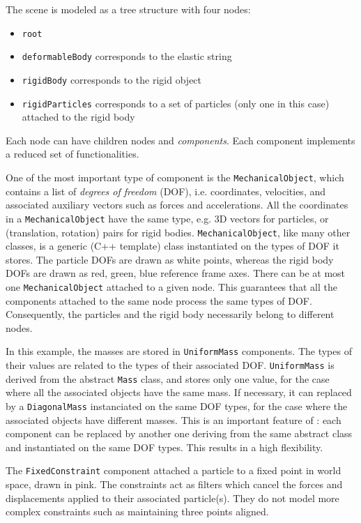 The scene is modeled as a tree structure with four nodes:
\begin{itemize}
 \item \texttt{root}
 \item \texttt{deformableBody} corresponds to the elastic string
 \item \texttt{rigidBody} corresponds to the rigid object
 \item \texttt{rigidParticles} corresponds to a set of particles (only one in this case) attached to the rigid body
\end{itemize}
Each node can have children nodes and \textit{components}. 
Each component implements a reduced set of functionalities.


One of the most important type of component is the \texttt{MechanicalObject}, which contains a list of \textit{degrees of freedom} (DOF), i.e. coordinates, velocities, and associated auxiliary vectors such as forces and accelerations.
All the coordinates in a \texttt{MechanicalObject} have the same type, e.g. 3D vectors for particles, or (translation, rotation) pairs for rigid bodies. 
\texttt{MechanicalObject}, like many other \sofa classes, is a generic (C++ template) class instantiated on the types of DOF it stores.
The particle DOFs are drawn as white points, whereas the rigid body DOFs are drawn as red, green, blue reference frame axes.
There can be at most one \texttt{MechanicalObject} attached to a given node. 
This guarantees that all the components attached to the same node process the same types of DOF. 
Consequently, the particles and the rigid body necessarily belong to different nodes.

In this example, the masses are stored in \texttt{UniformMass} components.
The types of their values are related to the types of their associated DOF.
\texttt{UniformMass} is derived from the abstract \texttt{Mass} class, and stores only one value, for the case where all the associated objects have the same mass. 
If necessary, it can replaced by a \texttt{DiagonalMass} instanciated on the same DOF types, for the case where the associated objects have different masses. 
This is an important feature of \sofa: each component can be replaced by another one deriving from the same abstract class and instantiated on the same DOF types. 
This results in a high flexibility.

The \texttt{FixedConstraint} component attached a particle to a fixed point in world space, drawn in pink. 
The constraints act as filters which cancel the forces and displacements applied to their associated particle(s). 
They do not model more complex constraints such as maintaining three points aligned.

